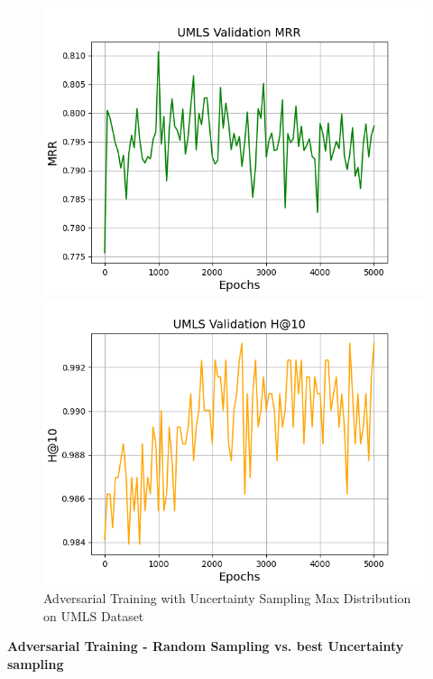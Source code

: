 \begin{figure}
\begin{minipage}{.5\textwidth}
      \includegraphics[width=0.9\linewidth]{figures/results/gan_train/pretrained/uncertainty/max_distribution/entropy/umls/gan_train_umls_mrr.png}
    \end{minipage}%
    \begin{minipage}{.5\textwidth}
      \centering
      \includegraphics[width=0.9\linewidth]{figures/results/gan_train/pretrained/uncertainty/max_distribution/entropy/umls/gan_train_umls_hit10.png}
    \end{minipage}%
    \caption{Adversarial Training with Uncertainty Sampling Max Distribution on \textsc{UMLS} Dataset}
    \label{fig:test}
\end{figure}



\textbf{Adversarial Training - Random Sampling vs. best Uncertainty sampling}\\



